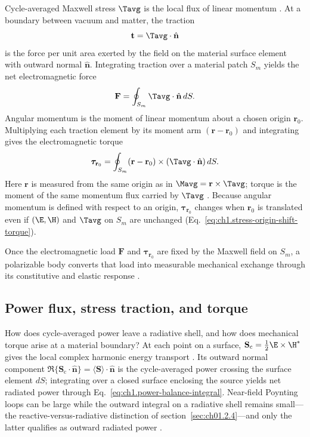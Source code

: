 \label{sec:ch01.5.1}

Cycle-averaged Maxwell stress $\Tavg$ is the local flux of linear momentum \cite{maxwell1873,stratton1941}. At a boundary between vacuum and matter, the traction
\begin{equation}
\label{eq:ch1.stress-traction-definition}
\mathbf{t}=\Tavg\cdot\hat{\mathbf{n}}
\end{equation}
is the force per unit area exerted by the field on the material surface element with outward normal $\hat{\mathbf{n}}$. Integrating traction over a material patch $S_m$ yields the net electromagnetic force
\begin{equation}
\label{eq:ch1.stress-force-integral}
\mathbf{F}=\oint_{S_m}\Tavg\cdot\hat{\mathbf{n}}\,dS.
\end{equation}
Angular momentum is the moment of linear momentum about a chosen origin $\mathbf{r}_0$. Multiplying each traction element by its moment arm $(\mathbf{r}-\mathbf{r}_0)$ and integrating gives the electromagnetic torque
\begin{equation}
\label{eq:ch1.stress-torque-integral}
\boldsymbol{\tau}_{\mathbf{r}_0}=\oint_{S_m}(\mathbf{r}-\mathbf{r}_0)\times(\Tavg\cdot\hat{\mathbf{n}})\,dS.
\end{equation}
Here $\mathbf{r}$ is measured from the same origin as in $\Mavg=\mathbf{r}\times\Tavg$; torque is the moment of the same momentum flux carried by $\Tavg$ \cite{stratton1941,beth1936}. Because angular momentum is defined with respect to an origin, $\boldsymbol{\tau}_{\mathbf{r}_0}$ changes when $\mathbf{r}_0$ is translated even if $(\E,\H)$ and $\Tavg$ on $S_m$ are unchanged (Eq.~\eqref{eq:ch1.stress-origin-shift-torque}).

Once the electromagnetic load $\mathbf{F}$ and $\boldsymbol{\tau}_{\mathbf{r}_0}$ are fixed by the Maxwell field on $S_m$, a polarizable body converts that load into measurable mechanical exchange through its constitutive and elastic response \cite{beth1936,stratton1941}.

\subsection{Power flux, stress traction, and torque}
\label{sec:ch01.5.2}

How does cycle-averaged power leave a radiative shell, and how does mechanical torque arise at a material boundary? At each point on a surface, $\mathbf{S}_\mathrm{c}=\tfrac{1}{2}\E\times\H^*$ gives the local complex harmonic energy transport \cite{poynting1884,stratton1941}. Its outward normal component $\Re\{\mathbf{S}_\mathrm{c}\cdot\hat{\mathbf{n}}\}=\langle\mathbf{S}\rangle\cdot\hat{\mathbf{n}}$ is the cycle-averaged power crossing the surface element $dS$; integrating over a closed surface enclosing the source yields net radiated power through Eq.~\eqref{eq:ch1.power-balance-integral}. Near-field Poynting loops can be large while the outward integral on a radiative shell remains small---the reactive-versus-radiative distinction of section~\ref{sec:ch01.2.4}---and only the latter qualifies as outward radiated power \cite{poynting1884}.

